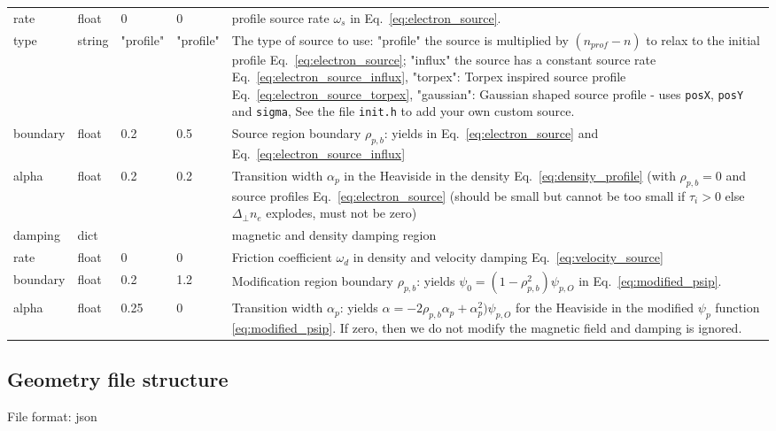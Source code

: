 \begin{longtable}{llllp{6cm}}
\qquad rate & float & 0    & 0 & profile source rate $\omega_s$ in Eq.~\eqref{eq:electron_source}.
\\
\qquad type & string & "profile" & "profile" & The type of source to use: "profile" the source is multiplied by $(n_{prof} - n)$ to relax to the initial profile Eq.~\eqref{eq:electron_source};
"influx" the source has a constant source rate Eq.~\eqref{eq:electron_source_influx},
"torpex": Torpex inspired source profile Eq.~\eqref{eq:electron_source_torpex},
"gaussian": Gaussian shaped source profile - uses \texttt{posX}, \texttt{posY} and \texttt{sigma},
    See the file {\tt init.h} to add your own custom source.
\\
\qquad boundary & float & 0.2  & 0.5 & Source region boundary $\rho_{p,b}$: yields in Eq.~\eqref{eq:electron_source} and Eq.~\eqref{eq:electron_source_influx}  \\
\qquad alpha  & float & 0.2 & 0.2 & Transition width $\alpha_p$ in the Heaviside
in the density Eq.~\eqref{eq:density_profile} (with $\rho_{p,b}=0$ and source profiles Eq.~\eqref{eq:electron_source} (should be
small but cannot be too small if $\tau_i > 0$ else $\Delta_\perp n_e$ explodes, must not be zero)
\\
damping & dict & & & magnetic and density damping region \\
\qquad rate & float & 0    & 0   & Friction coefficient $\omega_d$ in density and velocity damping Eq.~\eqref{eq:velocity_source} \\
\qquad boundary & float & 0.2  & 1.2 & Modification region boundary $\rho_{p,b}$: yields $\psi_0 = (1-\rho_{p,b}^2)\psi_{p,O}$ in Eq.~\eqref{eq:modified_psip}.
\\
\qquad alpha   & float & 0.25 & 0 & Transition width $\alpha_p$: yields
$\alpha=-2\rho_{p,b}\alpha_p+\alpha_p^2)\psi_{p,O}$ for the Heaviside in the modified
$\psi_p$ function \eqref{eq:modified_psip}. If zero, then we do not modify the
magnetic field and damping is ignored.\\
\bottomrule
\end{longtable}
\subsection{Geometry file structure} \label{sec:geometry_file}
File format: json

